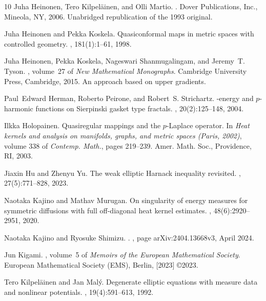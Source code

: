 \documentclass[11pt,a4paper]{article}
\numberwithin{equation}{section}
\theoremstyle{plain}
\theoremstyle{definition}
\begin{document}
\begin{thebibliography}{10}
Juha Heinonen, Tero Kilpel\"ainen, and Olli Martio.
.
\newblock Dover Publications, Inc., Mineola, NY, 2006.
\newblock Unabridged republication of the 1993 original.

Juha Heinonen and Pekka Koskela.
\newblock Quasiconformal maps in metric spaces with controlled geometry.
, 181(1):1--61, 1998.

Juha Heinonen, Pekka Koskela, Nageswari Shanmugalingam, and Jeremy~T. Tyson.
, volume~27 of {\em New
  Mathematical Monographs}.
\newblock Cambridge University Press, Cambridge, 2015.
\newblock An approach based on upper gradients.

Paul~Edward Herman, Roberto Peirone, and Robert~S. Strichartz.
-energy and {$p$}-harmonic functions on {S}ierpinski gasket type
  fractals.
, 20(2):125--148, 2004.

Ilkka Holopainen.
\newblock Quasiregular mappings and the {$p$}-{L}aplace operator.
\newblock In {\em Heat kernels and analysis on manifolds, graphs, and metric
  spaces ({P}aris, 2002)}, volume 338 of {\em Contemp. Math.}, pages 219--239.
  Amer. Math. Soc., Providence, RI, 2003.

Jiaxin Hu and Zhenyu Yu.
\newblock The weak elliptic {H}arnack inequality revisited.
, 27(5):771--828, 2023.

Naotaka Kajino and Mathav Murugan.
\newblock On singularity of energy measures for symmetric diffusions with full
  off-diagonal heat kernel estimates.
, 48(6):2920--2951, 2020.

Naotaka {Kajino} and Ryosuke {Shimizu}.
.
, page arXiv:2404.13668v3, April 2024.

Jun Kigami.
, volume~5 of {\em Memoirs of the European Mathematical
  Society}.
\newblock European Mathematical Society (EMS), Berlin, [2023] \copyright 2023.

Tero Kilpel\"ainen and Jan Mal\'y.
\newblock Degenerate elliptic equations with measure data and nonlinear
  potentials.
, 19(4):591--613, 1992.


\end{thebibliography}
\end{document}
